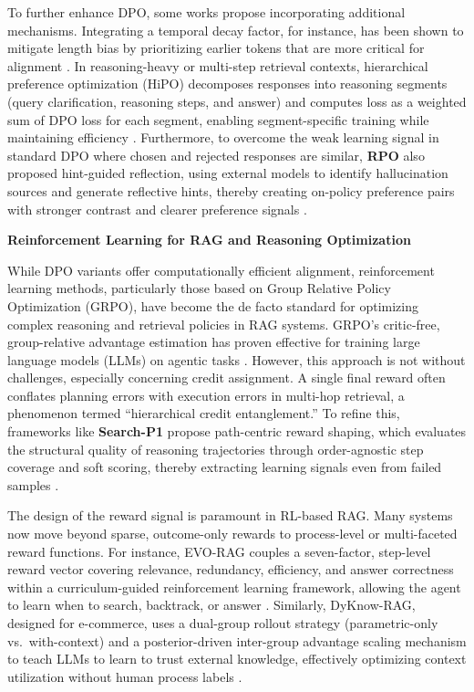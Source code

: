 \documentclass[11pt]{article}
\begin{document}
To further enhance DPO, some works propose incorporating additional mechanisms. Integrating a temporal decay factor, for instance, has been shown to mitigate length bias by prioritizing earlier tokens that are more critical for alignment \cite{ref261}. In reasoning-heavy or multi-step retrieval contexts, hierarchical preference optimization (HiPO) decomposes responses into reasoning segments (query clarification, reasoning steps, and answer) and computes loss as a weighted sum of DPO loss for each segment, enabling segment-specific training while maintaining efficiency \cite{ref262}. Furthermore, to overcome the weak learning signal in standard DPO where chosen and rejected responses are similar, \textbf{RPO} also proposed hint-guided reflection, using external models to identify hallucination sources and generate reflective hints, thereby creating on-policy preference pairs with stronger contrast and clearer preference signals \cite{ref263}.

\textbf{Reinforcement Learning for RAG and Reasoning Optimization}

While DPO variants offer computationally efficient alignment, reinforcement learning methods, particularly those based on Group Relative Policy Optimization (GRPO), have become the de facto standard for optimizing complex reasoning and retrieval policies in RAG systems. GRPO's critic-free, group-relative advantage estimation has proven effective for training large language models (LLMs) on agentic tasks \cite{ref264,ref265}. However, this approach is not without challenges, especially concerning credit assignment. A single final reward often conflates planning errors with execution errors in multi-hop retrieval, a phenomenon termed ``hierarchical credit entanglement.'' To refine this, frameworks like \textbf{Search-P1} propose path-centric reward shaping, which evaluates the structural quality of reasoning trajectories through order-agnostic step coverage and soft scoring, thereby extracting learning signals even from failed samples \cite{ref266}.

The design of the reward signal is paramount in RL-based RAG. Many systems now move beyond sparse, outcome-only rewards to process-level or multi-faceted reward functions. For instance, EVO-RAG couples a seven-factor, step-level reward vector covering relevance, redundancy, efficiency, and answer correctness within a curriculum-guided reinforcement learning framework, allowing the agent to learn when to search, backtrack, or answer \cite{ref267}. Similarly, DyKnow-RAG, designed for e-commerce, uses a dual-group rollout strategy (parametric-only vs.~with-context) and a posterior-driven inter-group advantage scaling mechanism to teach LLMs to learn to trust external knowledge, effectively optimizing context utilization without human process labels \cite{ref268}.
\end{document}

